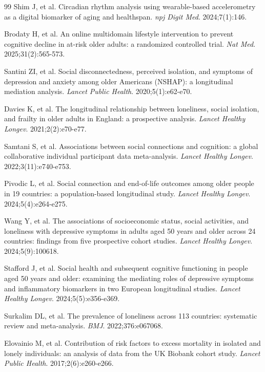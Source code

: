 \documentclass[10pt]{article}
\begin{document}
\begin{thebibliography}{99}
Shim J, et al. Circadian rhythm analysis using wearable-based accelerometry as a digital biomarker of aging and healthspan. \textit{npj Digit Med}. 2024;7(1):146.

Brodaty H, et al. An online multidomain lifestyle intervention to prevent cognitive decline in at-risk older adults: a randomized controlled trial. \textit{Nat Med}. 2025;31(2):565-573.

Santini ZI, et al. Social disconnectedness, perceived isolation, and symptoms of depression and anxiety among older Americans (NSHAP): a longitudinal mediation analysis. \textit{Lancet Public Health}. 2020;5(1):e62-e70.

Davies K, et al. The longitudinal relationship between loneliness, social isolation, and frailty in older adults in England: a prospective analysis. \textit{Lancet Healthy Longev}. 2021;2(2):e70-e77.

Samtani S, et al. Associations between social connections and cognition: a global collaborative individual participant data meta-analysis. \textit{Lancet Healthy Longev}. 2022;3(11):e740-e753.

Pivodic L, et al. Social connection and end-of-life outcomes among older people in 19 countries: a population-based longitudinal study. \textit{Lancet Healthy Longev}. 2024;5(4):e264-e275.

Wang Y, et al. The associations of socioeconomic status, social activities, and loneliness with depressive symptoms in adults aged 50 years and older across 24 countries: findings from five prospective cohort studies. \textit{Lancet Healthy Longev}. 2024;5(9):100618.

Stafford J, et al. Social health and subsequent cognitive functioning in people aged 50 years and older: examining the mediating roles of depressive symptoms and inflammatory biomarkers in two European longitudinal studies. \textit{Lancet Healthy Longev}. 2024;5(5):e356-e369.

Surkalim DL, et al. The prevalence of loneliness across 113 countries: systematic review and meta-analysis. \textit{BMJ}. 2022;376:e067068.

Elovainio M, et al. Contribution of risk factors to excess mortality in isolated and lonely individuals: an analysis of data from the UK Biobank cohort study. \textit{Lancet Public Health}. 2017;2(6):e260-e266.


\end{thebibliography}
\end{document}
